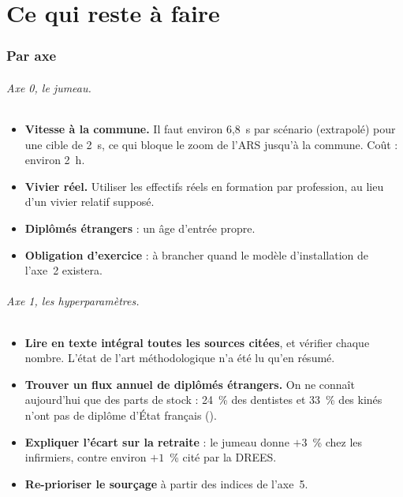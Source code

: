 \part{Ce qui reste à faire}

\section{Par axe}
\paragraph{Axe 0, le jumeau.}
\begin{itemize}
  \item \textbf{Vitesse à la commune.} Il faut environ 6,8~s par scénario (extrapolé) pour une
        cible de 2~s, ce qui bloque le zoom de l'ARS jusqu'à la commune. Coût : environ 2~h.
  \item \textbf{Vivier réel.} Utiliser les effectifs réels en formation par profession, au
        lieu d'un vivier relatif supposé.
  \item \textbf{Diplômés étrangers} : un âge d'entrée propre.
  \item \textbf{Obligation d'exercice} : à brancher quand le modèle d'installation de l'axe~2
        existera.
\end{itemize}

\paragraph{Axe 1, les hyperparamètres.}
\begin{itemize}
  \item \textbf{Lire en texte intégral toutes les sources citées}, et vérifier chaque nombre.
        L'état de l'art méthodologique n'a été lu qu'en résumé.
  \item \textbf{Trouver un flux annuel de diplômés étrangers.} On ne connaît aujourd'hui que
        des parts de stock : 24~\% des dentistes et 33~\% des kinés n'ont pas de diplôme
        d'État français (\mesure).
  \item \textbf{Expliquer l'écart sur la retraite} : le jumeau donne $+3$~\% chez les
        infirmiers, contre environ $+1$~\% cité par la DREES.
  \item \textbf{Re-prioriser le sourçage} à partir des indices de l'axe~5.
\end{itemize}

